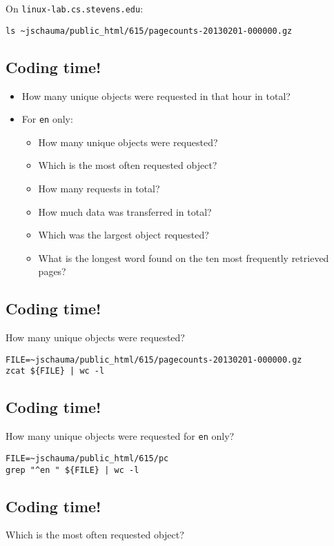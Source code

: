 \documentclass[xga]{xdvislides}
\begin{document}
On {\tt linux-lab.cs.stevens.edu}:
\begin{verbatim}
ls ~jschauma/public_html/615/pagecounts-20130201-000000.gz
\end{verbatim}

\subsection{Coding time!}
\begin{itemize}
	\item How many unique objects were requested in that hour in total?
	\item For {\tt en} only:
		\begin{itemize}
			\item How many unique objects were requested?
			\item Which is the most often requested object?
			\item How many requests in total?
			\item How much data was transferred in total?
			\item Which was the largest object requested?
			\item What is the longest word found on the ten most
				frequently retrieved pages?
		\end{itemize}
\end{itemize}

\subsection{Coding time!}
How many unique objects were requested?

\begin{verbatim}
FILE=~jschauma/public_html/615/pagecounts-20130201-000000.gz
zcat ${FILE} | wc -l
\end{verbatim}

\subsection{Coding time!}
How many unique objects were requested for {\tt en} only?

\begin{verbatim}
FILE=~jschauma/public_html/615/pc
grep "^en " ${FILE} | wc -l
\end{verbatim}

\subsection{Coding time!}
Which is the most often requested object?
\end{document}

